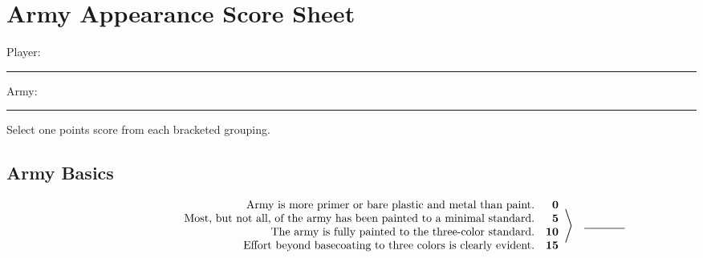 \documentclass[10pt,notitlepage]{report}
\newcommand{\scoredescr}[1]{\makebox[6in][r]{#1}}
\newcommand{\score}[1]{\quad\textbf{#1}}
\newcommand{\entry}{\quad\rule{.5in}{.5pt}}
\begin{document}
\scriptsize
\section*{Army Appearance Score Sheet}

\vspace{12pt}
Player: \rule{3in}{.5pt}\hspace{.5in}Army: \rule{3in}{.5pt}

\vspace{6pt}
\noindent Select one points score from each bracketed grouping.

\subsection*{Army Basics}

\begin{align*}
\left.
\begin{array}{r}
\scoredescr{Army is more primer or bare plastic and metal than paint.\score{\phantom{1}0}} \\
\scoredescr{Most, but not all, of the army has been painted to a minimal standard.\score{\phantom{1}5}} \\
\scoredescr{The army is fully painted to the three-color standard.\score{10}} \\
\textnormal{Effort beyond basecoating to three colors is clearly evident.\score{15}}
\end{array}
\right\rangle
 & \entry
\end{align*}
\end{document}
